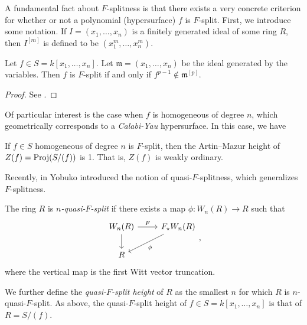 A fundamental fact about \(F\)-splitness is that there
exists a very concrete criterion for whether or 
not a polynomial (hypersurface) \(f\) is \(F\)-split.
First, we introduce some notation.
If \(I = (x_{1}, \ldots, x_{n})\) is a finitely generated 
ideal of some ring \(R\), 
then \(I^{[m]}\)
is defined to be \((x_{1}^{m}, \ldots, x_{n}^{m})\).

\begin{thm}
    \label{thm:fedder:criterion}
	Let \(f \in S = k[x_{1}, \ldots, x_{n}]\).
	Let \(\mathfrak{m} = (x_{1}, \ldots, x_{n})\) 
	be the ideal generated by the variables.
	Then \(f\) is \(F\)-split if and only if 
	\(f^{p-1} \notin \mathfrak{m}^{[p]}\).
\end{thm}

\begin{proof}
	See \cite[Theorem~2.5]{ma-polstra-2021-F-sing-comm-alg}.
\end{proof}

Of particular interest is the case when \(f\) is 
homogeneous of degree \(n\), which geometrically
corresponds to a \textit{Calabi-Yau} hypersurface.
In this case, we have

\begin{thm}
	\label{thm:fsplit:ordinary}
	If \(f \in S\) 
	homogeneous of degree \(n\) 
	is \(F\)-split,
	then the Artin--Mazur height 
	of \(Z(f) = \operatorname{Proj} (S / (f))\) 
	is 1. That is, \(Z(f)\) is weakly ordinary.
\end{thm}

Recently, in \cite{yobuko-2019-qfs-calabi-yau}
Yobuko introduced the notion of 
quasi-\(F\)-splitness, which generalizes \(F\)-splitness.

\begin{defn}
	The ring \(R\) is \textit{\(n\)-quasi-\(F\)-split} if there exists
	a map \(\phi \colon W_{n}(R) \xrightarrow{} R\) such that
	\[
	\begin{tikzcd}
		W_{n}(R) \arrow{r}{F} \arrow{d}[swap]{} &
		F_{\star}W_{n}(R) \arrow{ld}{\phi} \\
	R 
	\end{tikzcd}
	,\]
	where the vertical map is the first Witt vector truncation.
\end{defn}

We further define the \textit{quasi-\(F\)-split height} of \(R\) as the smallest \(n\) 
for which \(R\) is \(n\)-quasi-\(F\)-split.
As above, the quasi-\(F\)-split height of 
\(f \in S = k[x_{1}, \ldots, x_{n}]\) is that
of \(R = S / (f)\).

